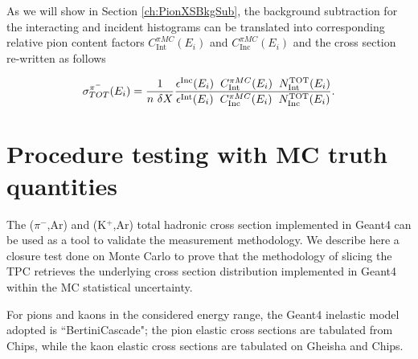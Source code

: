 As we will show in Section \ref{ch:PionXSBkgSub}, the background subtraction for the interacting and incident histograms can be translated into corresponding relative pion content factors $C^{\pi MC}_{\text{Int}} (E_{i})$ and $C^{\pi MC}_{\text{Inc}} (E_{i})$ and the cross section re-written as follows

\begin{equation}
      \sigma^{\pi^-}_{TOT}(E_{i})  = \frac{1}{n\text{ } \delta X}\frac{ \epsilon^{\text{Inc}}(E_i)  \hspace{0.2cm} C^{\pi MC}_{\text{Int}} (E_{i}) \hspace{0.2cm} N^{\text{TOT}}_{\text{Int}} (E_{i}) }{   \epsilon^{\text{Int}}(E_i) \hspace{0.2cm} C^{\pi MC}_{\text{Inc}} (E_{i}) \hspace{0.2cm}  N^{\text{TOT}}_{\text{Inc}} (E_{i})}.
\label{eq:C}
\end{equation}








\section{Procedure testing with MC truth quantities}\label{ch:procedureTesting}
The ($\pi^{-}$,Ar) and (K$^{+}$,Ar) total hadronic cross section implemented in Geant4 can be used as a tool to validate the measurement methodology.  We describe here a closure test done on Monte Carlo to prove that the methodology of slicing the TPC retrieves the underlying cross section distribution implemented in Geant4 within the MC statistical uncertainty. 

For pions and kaons in the considered energy range, the Geant4 inelastic model adopted is ``BertiniCascade"; the pion elastic cross sections are tabulated from Chips, while the kaon elastic cross sections are tabulated on Gheisha and Chips.

